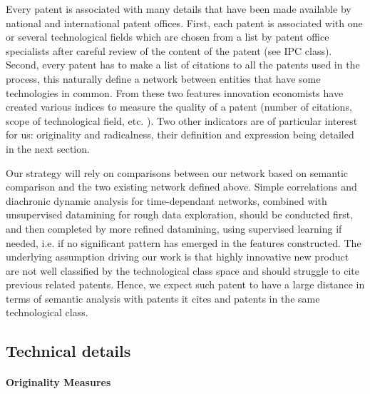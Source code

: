 Every patent is associated with many details that have been made available by national and international patent offices. First, each patent is associated with one or several technological fields which are chosen from a list by patent office specialists after careful review of the content of the patent (see IPC class). Second, every patent has to make a list of citations to all the patents used in the process, this naturally define a network between entities that have some technologies in common. From these two features innovation economists have created various indices to measure the quality of a patent (number of citations, scope of technological field, etc. ). Two other indicators are of particular interest for us: originality and radicalness, their definition and expression being detailed in the next section.

Our strategy will rely on comparisons between our network based on semantic comparison and the two existing network defined above. Simple correlations and diachronic dynamic analysis for time-dependant networks, combined with unsupervised datamining for rough data exploration, should be conducted first, and then completed by more refined datamining, using supervised learning if needed, i.e. if no significant pattern has emerged in the features constructed.
The underlying assumption driving our work is that highly innovative new product are not well classified by the technological class space and should struggle to cite previous related patents. %
Hence, we expect such patent to have a large distance in terms of semantic analysis with patents it cites and patents in the same technological class.


\subsection{Technical details}


\paragraph{Originality Measures}


